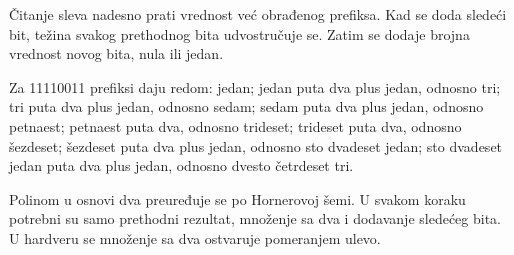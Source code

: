 Čitanje sleva nadesno prati vrednost već obrađenog prefiksa. Kad se doda sledeći bit, težina svakog prethodnog bita udvostručuje se. Zatim se dodaje brojna vrednost novog bita, nula ili jedan.

Za 11110011 prefiksi daju redom: jedan; jedan puta dva plus jedan, odnosno tri; tri puta dva plus jedan, odnosno sedam; sedam puta dva plus jedan, odnosno petnaest; petnaest puta dva, odnosno trideset; trideset puta dva, odnosno šezdeset; šezdeset puta dva plus jedan, odnosno sto dvadeset jedan; sto dvadeset jedan puta dva plus jedan, odnosno dvesto četrdeset tri.

Polinom u osnovi dva preuređuje se po Hornerovoj šemi. U svakom koraku potrebni su samo prethodni rezultat, množenje sa dva i dodavanje sledećeg bita. U hardveru se množenje sa dva ostvaruje pomeranjem ulevo.
